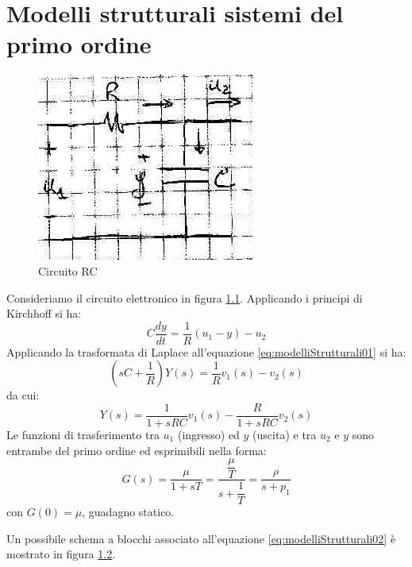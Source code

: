 \documentclass[a4paper]{report}
\begin{document}
\chapter{Modelli strutturali sistemi del primo ordine}
\begin{figure}[!hbp]
  \begin{center}
    \includegraphics[scale=0.5]{./figures/modelliStrutturali01.png}
    \caption{Circuito RC}
    \label{fig:circuitoRC}
  \end{center}
\end{figure}
Consideriamo il circuito elettronico in figura
\ref{fig:circuitoRC}. Applicando i principi di Kirchhoff si ha:
\begin{equation}\label{eq:modelliStrutturali01}
C \dfrac{dy}{dt} = \dfrac{1}{R} (u_1 - y) - u_2
\end{equation}
Applicando la trasformata di Laplace all'equazione
\ref{eq:modelliStrutturali01} si ha:
\[
(sC + \dfrac{1}{R}) Y(s) = \dfrac{1}{R} v_1(s) - v_2(s)
\]
da cui:
\begin{equation}\label{eq:modelliStrutturali02}
  Y(s) = \dfrac{1}{1 + sRC}v_1(s) - \dfrac{R}{1 + sRC} v_2(s)
\end{equation}
Le funzioni di trasferimento tra $u_1$ (ingresso) ed $y$ (uscita) e
tra $u_2$ e $y$ sono entrambe del primo ordine ed esprimibili nella
forma:
\begin{equation}\label{eq:modelliStrutturali03}
  G(s) = \dfrac{\mu}{1 + sT} = \dfrac{\dfrac{\mu}{T}}{s + \dfrac{1}{T}} =
    \dfrac{\rho}{s + p_1}
\end{equation}
con $G(0) = \mu$, guadagno statico.
\begin{figure}
  \center
  \caption{}
  \label{fig:modelliStrutturali01}
\end{figure}
Un possibile schema a blocchi
associato all'equazione \ref{eq:modelliStrutturali02} \`e mostrato in
figura \ref{fig:modelliStrutturali01}.
\end{document}
